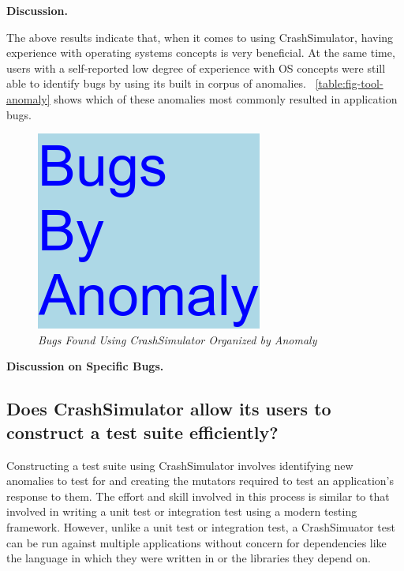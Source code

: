 {\bf Discussion. }

The above results indicate that, when it comes to using CrashSimulator,
having experience with operating systems concepts is very beneficial.  At
the same time, users with a self-reported low degree of experience with OS
concepts were still able to identify bugs by using its built in corpus of
anomalies. ~\ref{table:fig-tool-anomaly} shows which
of these anomalies most commonly
resulted in application bugs.

\begin{figure}[t]
  \center{}
  \includegraphics[scale=.5]{images/anomaly}
  \caption{\emph{Bugs Found Using CrashSimulator Organized by Anomaly}}
  \label{fig-tool-anomaly}
\end{figure}


{\bf Discussion on Specific Bugs. }


\subsection{Does CrashSimulator allow its users to construct a test suite
efficiently?}

Constructing a test suite using CrashSimulator involves identifying new
anomalies to test for and creating the mutators required
to test an application's response to them.
The effort and skill involved in
this process is similar to that involved in writing a unit test or
integration test using a modern testing framework.  However, unlike a unit
test or integration test, a CrashSimuator test can be run
against multiple
applications without concern for dependencies like the language in which
they were
written in or the libraries they depend on.


